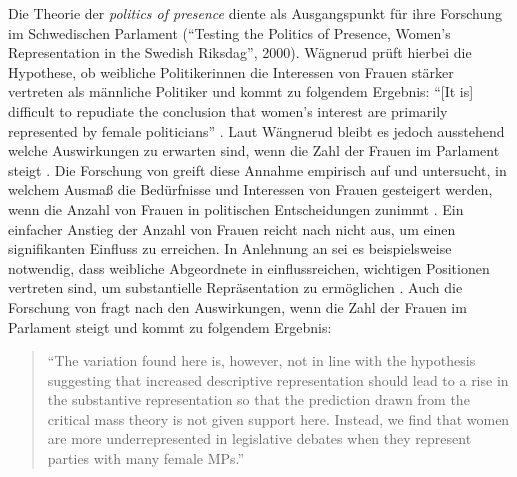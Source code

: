 \documentclass[12pt, 
    twoside=false, 
    bibliography=totoc, 
    numbers=endperiod, 
    headings=normal, 
    toc=chapterentrydotfill
    ]{scrbook}
\begin{document}
%
Die Theorie der \emph{politics of presence} \parencite{phillips_1998} diente \textcite{wangnerud_2000} als Ausgangspunkt für ihre Forschung im Schwedischen Parlament (\enquote{Testing the Politics of Presence, Women's Representation in the Swedish Riksdag}, 2000). Wägnerud prüft hierbei die Hypothese, ob weibliche Politikerinnen die Interessen von Frauen stärker vertreten als männliche Politiker \parencite[84]{wangnerud_2000} und kommt zu folgendem Ergebnis: \enquote{[It is] difficult to repudiate the conclusion that women's interest are primarily represented by female politicians} \parencite[][84]{wangnerud_2000}. Laut Wängnerud \parencite*{wangnerud_2000} bleibt es jedoch ausstehend welche Auswirkungen zu erwarten sind, wenn die Zahl der Frauen im Parlament steigt \parencite{wangnerud_2009}.
Die Forschung von \textcite{celis_2008} greift diese Annahme empirisch auf und untersucht, in welchem Ausmaß die Bedürfnisse und Interessen von Frauen gesteigert werden, wenn die Anzahl von Frauen in politischen Entscheidungen zunimmt \parencite[vgl. auch][4]{galligan_2016}. Ein einfacher Anstieg der Anzahl von Frauen reicht nach \textcite{celis_2008} nicht aus, um einen signifikanten Einfluss zu erreichen. In Anlehnung an \textcite{caul_2001} sei es beispielsweise notwendig, dass weibliche Abgeordnete in einflussreichen, wichtigen Positionen vertreten sind, um substantielle Repräsentation zu ermöglichen \parencites{caul_2001}[vgl. auch][14]{coffe_2013}.
Auch die Forschung von \textcite{back_2018} fragt nach den Auswirkungen, wenn die Zahl der Frauen im Parlament steigt und kommt zu folgendem Ergebnis: 

\begin{quote}
  \enquote{The variation found here is, however, not in line with the hypothesis suggesting that increased descriptive representation should lead to a rise in the substantive representation so that the prediction drawn from the critical mass theory is not given support here. Instead, we find that women are more underrepresented in legislative debates when they represent parties with many female MPs.}
  \parencite[17]{back_2018}
\end{quote}
\end{document}
